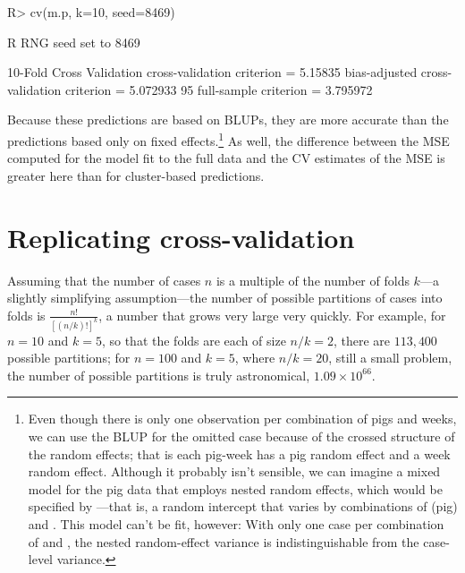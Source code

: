 \documentclass[
]{jss}
\begin{document}
\begin{CodeChunk}
\begin{CodeInput}
R> cv(m.p, k=10, seed=8469)
\end{CodeInput}
\begin{CodeOutput}
R RNG seed set to 8469
\end{CodeOutput}
\begin{CodeOutput}
10-Fold Cross Validation
cross-validation criterion = 5.15835
bias-adjusted cross-validation criterion = 5.072933
95%
full-sample criterion = 3.795972 
\end{CodeOutput}
\end{CodeChunk}

Because these predictions are based on BLUPs, they are more accurate
than the predictions based only on fixed effects.\footnote{Even though
  there is only one observation per combination of pigs and weeks, we
  can use the BLUP for the omitted case because of the crossed structure
  of the random effects; that is each pig-week has a pig random effect
  and a week random effect. Although it probably isn't sensible, we can
  imagine a mixed model for the pig data that employs nested random
  effects, which would be specified by
  ---that is, a
  random intercept that varies by combinations of  (pig) and
  . This model can't be fit, however: With only one case per
  combination of  and , the nested random-effect
  variance is indistinguishable from the case-level variance.} As well,
the difference between the MSE computed for the model fit to the full
data and the CV estimates of the MSE is greater here than for
cluster-based predictions.

\hypertarget{replicating-cross-validation}{%
\section{Replicating
cross-validation}\label{replicating-cross-validation}}

Assuming that the number of cases \(n\) is a multiple of the number of
folds \(k\)---a slightly simplifying assumption---the number of possible
partitions of cases into folds is \(\frac{n!}{[(n/k)!]^k}\), a number
that grows very large very quickly. For example, for \(n = 10\) and
\(k = 5\), so that the folds are each of size \(n/k = 2\), there are
\(113,400\) possible partitions; for \(n=100\) and \(k=5\), where
\(n/k = 20\), still a small problem, the number of possible partitions
is truly astronomical, \(1.09\times 10^{66}\).
\end{document}

